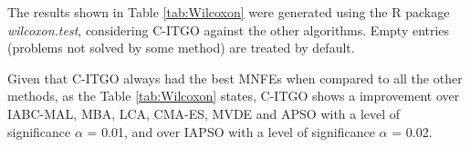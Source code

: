 The results shown in Table \ref{tab:Wilcoxon} were generated using the R package \textit{wilcoxon.test}, considering C-ITGO against the other algorithms. Empty entries (problems not solved by some method) are treated by default.




Given that C-ITGO always had the best MNFEs when compared to all the other methods, as the Table \ref{tab:Wilcoxon} states, C-ITGO shows a improvement over IABC-MAL, MBA, LCA, CMA-ES, MVDE and APSO  with a level of significance $\alpha$ = 0.01, and over IAPSO with a level of significance $\alpha$ = 0.02.